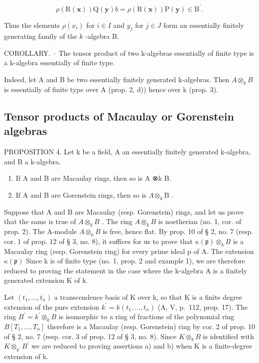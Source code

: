 \[
\rho (\mathrm{R} (\mathbf {x})) \mathrm{Q} (\mathbf {y}) b = \rho (\mathrm{R} (\mathbf {x})) \mathrm{P} (\mathbf {y}) \in \mathrm{B} ^ {\prime}.
\]

Thus the elements \(\rho(x_i)\) for \(i \in I\) and \(y_j\) for \(j \in J\) form an essentially finitely generating family of the \(k\) -algebra B.

COROLLARY. -- The tensor product of two k-algebras essentially of finite type is a k-algebra essentially of finite type.

Indeed, let A and B be two essentially finitely generated k-algebras. Then \(A \otimes_{k} B\) is essentially of finite type over A (prop. 2, d)) hence over k (prop. 3).

\subsection{Tensor products of Macaulay or Gorenstein algebras}

PROPOSITION 4. Let k be a field, A an essentially finitely generated k-algebra, and B a k-algebra.

\begin{enumerate}
\def\labelenumi{\alph{enumi})}
\item
  If A and B are Macaulay rings, then so is A ⊗k B.
\item
  If A and B are Gorenstein rings, then so is \(\Lambda\otimes_{k}\mathrm{B}\) .
\end{enumerate}

Suppose that A and B are Macaulay (resp. Gorenstein) rings, and let us prove that the same is true of \(A \otimes_{k} B\) . The ring \(A \otimes_{k} B\) is noetherian (no. 1, cor. of prop. 2). The A-module \(A \otimes_{k} B\) is free, hence flat. By prop. 10 of § 2, no. 7 (resp. cor. 1 of prop. 12 of § 3, no. 8), it suffices for us to prove that \(\kappa(\mathfrak{p}) \otimes_{k} B\) is a Macaulay ring (resp. Gorenstein ring) for every prime ideal p of A. The extension \(\kappa(\mathfrak{p})\) Since k is of finite type (no. 1, prop. 2 and example 1), we are therefore reduced to proving the statement in the case where the k-algebra A is a finitely generated extension K of k.

Let \((t_{1},\ldots,t_{n})\) a transcendence basis of K over k, so that K is a finite degree extension of the pure extension \(k^{\prime}=k(t_{1},\ldots,t_{n})\) (A, V, p.~112, prop. 17). The ring \(B^{\prime}=k^{\prime}\otimes_{k}B\) is isomorphic to a ring of fractions of the polynomial ring \(B[T_{1},\ldots,T_{n}]\) therefore is a Macaulay (resp. Gorenstein) ring by cor. 2 of prop. 10 of § 2, no. 7 (resp. cor. 3 of prop. 12 of § 3, no. 8). Since \(K\otimes_{k}B\) is identified with \(K\otimes_{k^{\prime}}B^{\prime}\) we are reduced to proving assertions a) and b) when K is a finite-degree extension of k.

